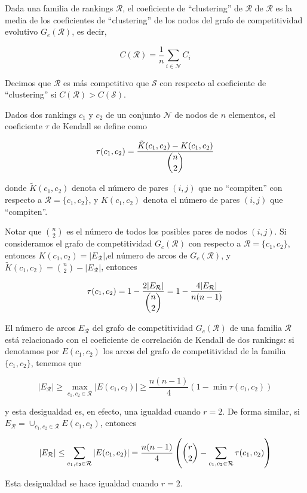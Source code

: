 \begin{defi}
Dada una familia de rankings $\mathcal{R}$, el coeficiente de ``clustering'' de $\mathcal{R}$ de $\mathcal{R}$ es la media de los coeficientes de ``clustering'' de los nodos del grafo de competitividad evolutivo $G_e(\mathcal{R})$, es decir,

\[ C(\mathcal{R}) = \dfrac{1}{n} \sum_{i \in \mathcal{N}} C_i \]
\end{defi}

\begin{defi}
Decimos que $\mathcal{R}$ es más competitivo que $\mathcal{S}$ con respecto al coeficiente de ``clustering'' si $C(\mathcal{R}) > C(\mathcal{S})$.
\end{defi}

\begin{defi}
Dados dos rankings $c_1$ y $c_2$ de un conjunto $\mathcal{N}$ de nodos de $n$ elementos, el coeficiente $\tau$ de Kendall se define como

\[ \tau(c_1, c_2) = \dfrac{\tilde{K}(c_1, c_2) - K(c_1, c_2)}{\dbinom{n}{2}} \]

donde $\tilde{K}(c_1, c_2)$ denota el número de pares $(i,j)$ que no ``compiten'' con respecto a $\mathcal{R} = \{c_1, c_2\}$, y $K(c_1, c_2)$ denota el número de pares $(i,j)$ que ``compiten''.
\end{defi}

\begin{nota}
Notar que $\binom{n}{2}$ es el número de todos los posibles pares de nodos $(i,j)$. Si consideramos el grafo de competitividad $G_c(\mathcal{R})$ con respecto a $\mathcal{R} = \{c_1, c_2\}$, entonces $K(c_1, c_2) = |E_\mathcal{R}|$,el número de arcos de $G_c(\mathcal{R})$, y $\tilde{K}(c_1, c_2) = \binom{n}{2} - |E_\mathcal{R}|$, entonces

\[ \tau(c_1,c_2) = 1 - \dfrac{2 |E_\mathcal{R}|}{\dbinom{n}{2}} = 1- \dfrac{4 |E_\mathcal{R}|}{n(n-1)} \]

El número de arcos $E_\mathcal{R}$ del grafo de competitividad $G_c(\mathcal{R})$ de una familia $\mathcal{R}$ está relacionado con el coeficiente de correlación de Kendall de dos rankings: si denotamos por $E(c_1, c_2)$ los arcos del grafo de competitividad de la familia $\{c_1, c_2\}$, tenemos que

\[ |E_\mathcal{R}| \geq \max_{c_1, c_2 \in \mathcal{R}} |E(c_1, c_2)| \geq \dfrac{n(n-1)}{4}(1 - \min \tau(c_1, c_2)) \]

y esta desigualdad es, en efecto, una igualdad cuando $r=2$. De forma similar, si $E_\mathcal{R} = \cup_{c_1, c_2 \in \mathcal{R}} E(c_1, c_2)$, entonces

\[ |E_\mathcal{R}| \leq \sum_{c_1, c_2 \in \mathcal{R}} |E(c_1, c_2)| = \dfrac{n(n-1)}{4} \left( \dbinom{r}{2} - \sum_{c_1, c_2 \in \mathcal{R}} \tau(c_1, c_2) \right) \]

Esta desigualdad se hace igualdad cuando $r=2$.
\end{nota}

